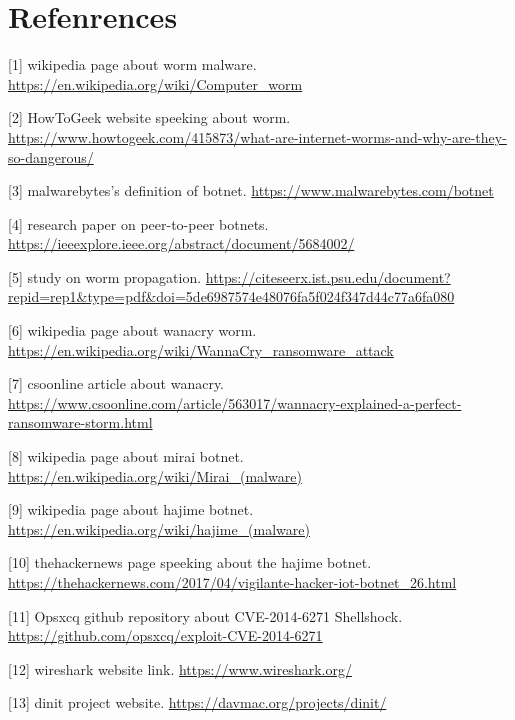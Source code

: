 \documentclass[../main.tex]{subfiles}
\begin{document}
	\chapter*{Refenrences}
	{

        [1] wikipedia page about worm malware. \url{https://en.wikipedia.org/wiki/Computer_worm}

        [2] HowToGeek website speeking about worm.
        \url{https://www.howtogeek.com/415873/what-are-internet-worms-and-why-are-they-so-dangerous/}

        [3] malwarebytes's definition of botnet.
        \url{https://www.malwarebytes.com/botnet}

        [4] research paper on peer-to-peer botnets.
        \url{https://ieeexplore.ieee.org/abstract/document/5684002/}

        [5] study on worm propagation.
        \url{https://citeseerx.ist.psu.edu/document?repid=rep1&type=pdf&doi=5de6987574e48076fa5f024f347d44c77a6fa080}

        [6] wikipedia page about wanacry worm.
        \url{https://en.wikipedia.org/wiki/WannaCry_ransomware_attack}

        [7] csoonline article about wanacry.
        \url{https://www.csoonline.com/article/563017/wannacry-explained-a-perfect-ransomware-storm.html}

        [8] wikipedia page about mirai botnet.
        \url{https://en.wikipedia.org/wiki/Mirai_(malware)}

        [9] wikipedia page about hajime botnet.
        \url{https://en.wikipedia.org/wiki/hajime_(malware)}

        [10] thehackernews page speeking about the hajime botnet.
        \url{https://thehackernews.com/2017/04/vigilante-hacker-iot-botnet_26.html}

        [11] Opsxcq github repository about CVE-2014-6271 Shellshock.
        \url{https://github.com/opsxcq/exploit-CVE-2014-6271}

        [12] wireshark website link.
        \url{https://www.wireshark.org/}

        [13] dinit project website.
        \url{https://davmac.org/projects/dinit/}

		\vspace{10pt}

	}
\end{document}
